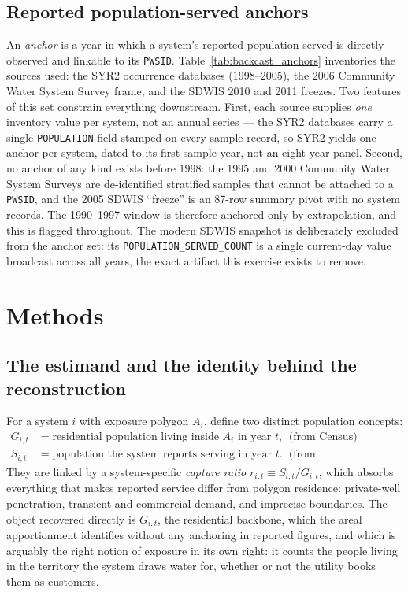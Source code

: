 \documentclass[11pt]{article}
\newcommand{\PWSID}{\texttt{PWSID}}
\begin{document}
\subsection{Reported population-served anchors}
An \emph{anchor} is a year in which a system's reported population served is
directly observed and linkable to its \PWSID. Table~\ref{tab:backcast_anchors}
inventories the sources used: the SYR2 occurrence databases (1998--2005), the
2006 Community Water System Survey frame, and the SDWIS 2010 and 2011 freezes.
Two features of this set constrain everything downstream. First, each source
supplies \emph{one} inventory value per system, not an annual series --- the
SYR2 databases carry a single \texttt{POPULATION} field stamped on every
sample record, so SYR2 yields one anchor per system, dated to its first sample
year, not an eight-year panel. Second, no anchor of any kind exists before
1998: the 1995 and 2000 Community Water System Surveys are de-identified
stratified samples that cannot be attached to a \PWSID, and the 2005 SDWIS
``freeze'' is an 87-row summary pivot with no system records. The 1990--1997
window is therefore anchored only by extrapolation, and this is flagged
throughout. The modern SDWIS snapshot is deliberately excluded from the anchor
set: its \texttt{POPULATION\_SERVED\_COUNT} is a single current-day value
broadcast across all years, the exact artifact this exercise exists to
remove.



\section{Methods}
\label{sec:methods}

\subsection{The estimand and the identity behind the reconstruction}
\label{sec:identity}

For a system $i$ with exposure polygon $A_i$, define two distinct population
concepts:
\begin{align}
G_{i,t} &= \text{residential population living inside } A_i \text{ in year } t,
  &&\text{(from Census)} \label{eq:G-def}\\
S_{i,t} &= \text{population the system reports serving in year } t.
  &&\text{(from SDWIS/anchors)} \label{eq:S-def}
\end{align}
They are linked by a system-specific \emph{capture ratio}
$r_{i,t}\equiv S_{i,t}/G_{i,t}$, which absorbs everything that makes reported
service differ from polygon residence: private-well penetration, transient and
commercial demand, and imprecise boundaries. The object recovered directly is
$G_{i,t}$, the residential backbone, which the areal apportionment identifies
without any anchoring in reported figures, and which is arguably the right
notion of exposure in its own right: it counts the people living in the
territory the system draws water for, whether or not the utility books them as
customers.
\end{document}
